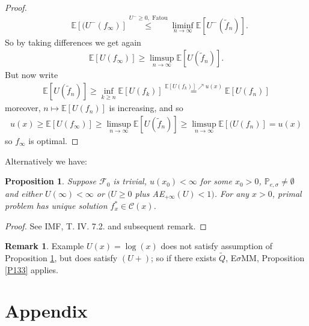 \documentclass[12pt,a4paper, twoside]{article}
\newtheorem{prop}{Proposition}[section]
\theoremstyle{definition}
\newtheorem{rem}{Remark}[section]
\newcommand{\EE}{\mathbb{E}} %
\newcommand{\PP}{\mathbb{P}} %
\begin{document}
\begin{proof}
\begin{align*}
& \EE[(U^-( f_\infty)] \overset{U^- \geq 0, \text{ Fatou}} \leq \liminf_{n \to \infty} \EE[U^- ( \widetilde{f}_n)]. 
\end{align*}
So by taking differences we get again 
\begin{align*}
\EE[U(f_\infty)] \geq \limsup_{n \to \infty} \EE[U( \widetilde{f}_n)].
\end{align*}
But now write 
\begin{align*}
\EE[U( \widetilde{f}_n)] \geq \inf_{k \geq n} \EE[U(f_k)] \overset{ \EE[U(f_k)] \nearrow u(x)}= \EE[U(f_n)]
\end{align*}
moreover, $n \mapsto \EE[U(f_n)]$ is increasing,  and so 
\begin{align*}
u(x) \geq \EE[U(f_\infty)] \geq \limsup_{n \to \infty} \EE[U( \widetilde{f}_n)] \geq \limsup_{n \to \infty} \EE[(U(f_n)] = u(x)
\end{align*}
so $f_\infty$ is optimal. 
\end{proof}
Alternatively we have:
\begin{prop} \label{P134} Suppose $\mathcal{F}_0$ is trivial,  $u(x_0) < \infty$ for some $x_0 >0$, $ \PP_{e,  \sigma} \neq \emptyset$ and either $U( \infty) < \infty$ or $(U \geq 0$ plus AE$_{+ \infty}(U) < 1)$. For any $x >0$, primal problem has unique solution $f_x^* \in \mathcal{C}(x)$.
\end{prop}
\begin{proof}
See IMF, T. IV. 7.2. and subsequent remark.
\end{proof}
\begin{rem} Example $U(x)= \log(x)$ does not satisfy assumption of Proposition \ref{P134},  but does satisfy $(U+)$; so if there exists $\widetilde{Q}$, E$\sigma$MM, Proposition \ref{P133} applies. 
\end{rem}
\newpage
\section{Appendix}
\end{document}
